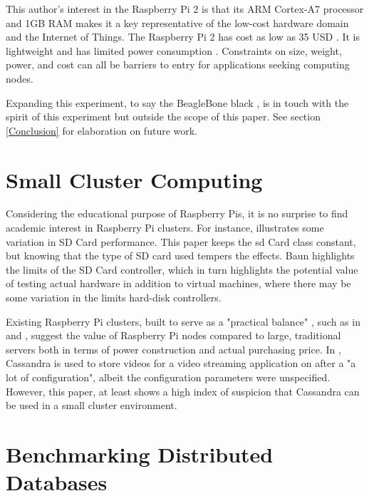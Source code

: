 This author's interest in the Raspberry Pi 2 is that its ARM Cortex-A7 processor and 1GB RAM \cite{RaspberryB} makes it a key representative of the low-cost hardware domain and the Internet of Things.
The Raspberry Pi 2 has cost as low as 35 USD \cite{RaspberryPi}.
It is lightweight and has limited power consumption \cite{RaspberryB}.
Constraints on size, weight, power, and cost can all be barriers to entry for applications seeking computing nodes.

Expanding this experiment, to say the BeagleBone black \cite{BeagleBoard.orgBlack}, is in touch with the spirit of this experiment but outside the scope of this paper.
See section \ref{Conclusion} for elaboration on future work.

\section{Small Cluster Computing}
Considering the educational purpose of Raspberry Pis, it is no surprise to find academic interest in Raspberry Pi clusters.
For instance, \cite{Baun2016MobileResearchers.} illustrates some variation in SD Card performance.
This paper keeps the \gls{sd} Card class constant, but knowing that the type of SD card used tempers the effects.
Baun highlights the limits of the SD Card controller, which in turn highlights the potential value of testing actual hardware in addition to virtual machines, where there may be some variation in the limits hard-disk controllers.

Existing Raspberry Pi clusters, built to serve as a "practical balance" \cite{Tso2013TheInfrastructures}, such as in \cite{Kiepert2013CreatingCluster} and \cite{Tso2013TheInfrastructures}, suggest the value of Raspberry Pi nodes compared to large, traditional servers both in terms of power construction and actual purchasing price.
In \cite{Velthuis2015SmallStreaming}, Cassandra is used to store videos for a video streaming application on after a "a lot of configuration", albeit the configuration parameters were unspecified.
However, this paper, \cite{Velthuis2015SmallStreaming} at least shows a high index of suspicion that Cassandra can be used in a small cluster environment.

\section{Benchmarking Distributed Databases}
